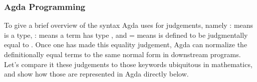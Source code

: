 \begin{code}[hide]
%
\\[\AgdaEmptyExtraSkip]%
\>[0]\AgdaSpace{}%
\AgdaSymbol{=}\AgdaSpace{}%
\<%
\\
%
\\[\AgdaEmptyExtraSkip]%
\>[0]\AgdaSpace{}%
\AgdaSymbol{:}\AgdaSpace{}%
\AgdaSpace{}%
\AgdaSpace{}%
\AgdaSpace{}%
\AgdaSpace{}%
\<%
\\
\>[0]\AgdaSpace{}%
\AgdaSpace{}%
\AgdaSymbol{=}\AgdaSpace{}%
\AgdaSpace{}%
\AgdaSpace{}%
\AgdaSpace{}%
\<%
\\
\>[0]\<%
\end{code}

\subsubsection{Agda Programming}

To give a brief overview of the syntax Agda uses for judgements, namely 
:  means  is a type,  :  means a term 
has type , and  =  means  is defined to be
judgmentally equal to . Once one has made this equality judgement, Agda
can normalize the definitionally equal terms to the same normal form in
downstream programs. Let's compare it these judgements to those keywords ubiquitous in
mathematics, and show how those are represented in Agda directly below.

